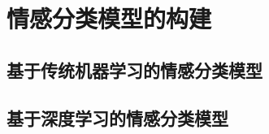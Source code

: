 \section{情感分类模型的构建}
\label{sec:emotion_cls}


\subsection{基于传统机器学习的情感分类模型}
\label{ssec:traditional_cls}

\subsection{基于深度学习的情感分类模型}
\label{ssec:dnn_cls}










